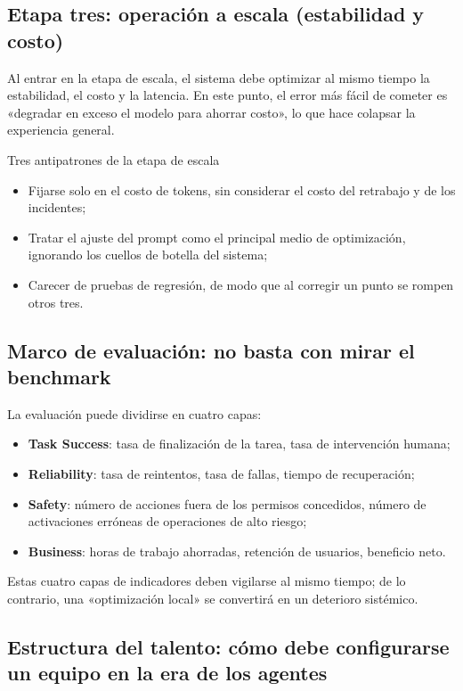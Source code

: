\subsection{Etapa tres: operación a escala (estabilidad y costo)}

Al entrar en la etapa de escala, el sistema debe optimizar al mismo tiempo la estabilidad, el costo y la latencia. En este punto, el error más fácil de cometer es «degradar en exceso el modelo para ahorrar costo», lo que hace colapsar la experiencia general.

\begin{warningbox}{Tres antipatrones de la etapa de escala}
\begin{itemize}
    \item Fijarse solo en el costo de tokens, sin considerar el costo del retrabajo y de los incidentes;
    \item Tratar el ajuste del prompt como el principal medio de optimización, ignorando los cuellos de botella del sistema;
    \item Carecer de pruebas de regresión, de modo que al corregir un punto se rompen otros tres.
\end{itemize}
\end{warningbox}

\subsection{Marco de evaluación: no basta con mirar el benchmark}

La evaluación puede dividirse en cuatro capas:
\begin{itemize}
    \item \textbf{Task Success}: tasa de finalización de la tarea, tasa de intervención humana;
    \item \textbf{Reliability}: tasa de reintentos, tasa de fallas, tiempo de recuperación;
    \item \textbf{Safety}: número de acciones fuera de los permisos concedidos, número de activaciones erróneas de operaciones de alto riesgo;
    \item \textbf{Business}: horas de trabajo ahorradas, retención de usuarios, beneficio neto.
\end{itemize}

Estas cuatro capas de indicadores deben vigilarse al mismo tiempo; de lo contrario, una «optimización local» se convertirá en un deterioro sistémico.

\subsection{Estructura del talento: cómo debe configurarse un equipo en la era de los agentes}


